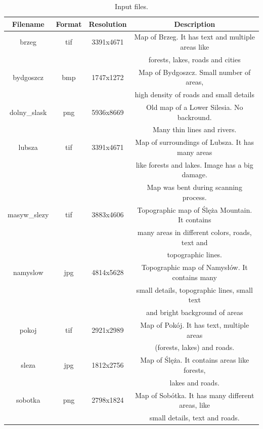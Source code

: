 \documentclass[a4paper,onecolumn,oneside,12pt]{memoir}
\begin{document}
\begin{table}[!ht]
\begin{center}
\caption{Input files.}
\label{tableInputFiles}
\begin{tabular}{|c|c|c|c|}
  \hline
  Filename & Format & Resolution & Description \\
  \hline
  brzeg & tif & 3391x4671 & Map of Brzeg. It has text and multiple areas like \\
        &     &           & forests, lakes, roads and cities \\
  \hline
  bydgoszcz & bmp & 1747x1272 & Map of Bydgoszcz. Small number of areas, \\
            &     &           & high density of roads and small details \\
  \hline
  dolny\_slask & png & 5936x8669 & Old map of a Lower Silesia. No backround. \\
              &     &           & Many thin lines and rivers. \\
  \hline
  lubsza & tif & 3391x4671 & Map of surroundings of Lubsza. It has many areas \\
         &     &           & like forests and lakes. Image has a big damage. \\
         &     &           & Map was bent during scanning process. \\
  \hline
  masyw\_slezy & tif & 3883x4606 & Topographic map of Ślęża Mountain. It contains \\
              &     &           & many areas in different colors, roads, text and \\
              &     &           & topographic lines. \\
  \hline
  namyslow & jpg & 4814x5628 & Topographic map of Namysłów. It contains many \\
           &     &           & small details, topographic lines, small text  \\
           &     &           & and bright background of areas\\
  \hline
  pokoj & tif & 2921x2989 & Map of Pokój. It has text, multiple areas \\
        &     &           & (forests, lakes) and roads. \\
  \hline
  sleza & jpg & 1812x2756 & Map of Ślęża. It contains areas like forests, \\
        &     &           & lakes and roads. \\
  \hline
  sobotka & png & 2798x1824 & Map of Sobótka. It has many different areas, like \\
          &     &           & small details, text and roads. \\
  \hline
\end{tabular}
\end{center}
\end{table}
\end{document}
